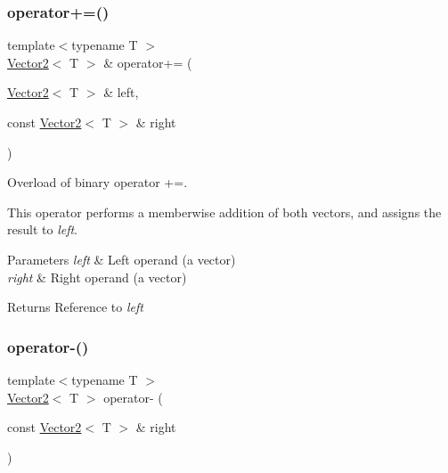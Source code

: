 \subsubsection{\texorpdfstring{operator+=()}{operator+=()}}
{\footnotesize\ttfamily template$<$typename T $>$ \\
\mbox{\hyperlink{classsf_1_1_vector2}{Vector2}}$<$ T $>$ \& operator+= (\begin{DoxyParamCaption}\item[{\mbox{\hyperlink{classsf_1_1_vector2}{Vector2}}$<$ T $>$ \&}]{left,  }\item[{const \mbox{\hyperlink{classsf_1_1_vector2}{Vector2}}$<$ T $>$ \&}]{right }\end{DoxyParamCaption})\hspace{0.3cm}{\ttfamily [related]}}



Overload of binary operator +=. 

This operator performs a memberwise addition of both vectors, and assigns the result to {\itshape left}.


\begin{DoxyParams}{Parameters}
{\em left} & Left operand (a vector) \\
\hline
{\em right} & Right operand (a vector)\\
\hline
\end{DoxyParams}
\begin{DoxyReturn}{Returns}
Reference to {\itshape left} \begin{DoxyVerb}\end{DoxyVerb}
 
\end{DoxyReturn}
\mbox{\label{classsf_1_1_vector2_a3885c2e66dc427cec7eaa178d59d8e8b}} 
\subsubsection{\texorpdfstring{operator-\/()}{operator-()}\hspace{0.1cm}{\footnotesize\ttfamily [1/2]}}
{\footnotesize\ttfamily template$<$typename T $>$ \\
\mbox{\hyperlink{classsf_1_1_vector2}{Vector2}}$<$ T $>$ operator-\/ (\begin{DoxyParamCaption}\item[{const \mbox{\hyperlink{classsf_1_1_vector2}{Vector2}}$<$ T $>$ \&}]{right }\end{DoxyParamCaption})\hspace{0.3cm}{\ttfamily [related]}}



